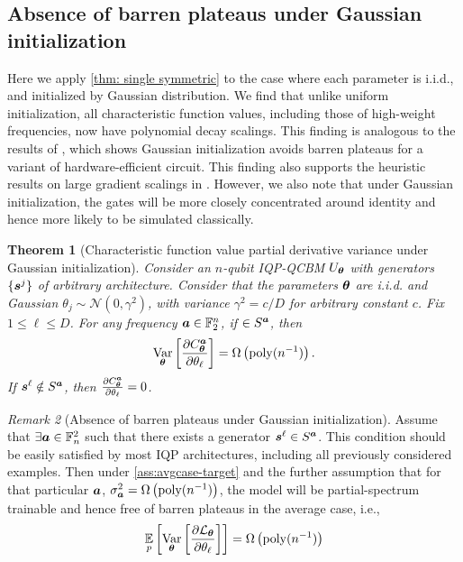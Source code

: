 \documentclass[10pt, twocolumn, a4paper]{article}
\theoremstyle{plain}
\newtheorem{theorem}{Theorem}[section]
\theoremstyle{definition}
\theoremstyle{remark}
\newtheorem{remark}[theorem]{Remark}
\begin{document}
\subsection{Absence of barren plateaus under Gaussian initialization} \label{subsec:gaussian}
Here we apply \cref{thm: single symmetric} to the case where each parameter is i.i.d., and initialized by Gaussian distribution. We find that unlike uniform initialization, all characteristic function values, including those of high-weight frequencies, now have polynomial decay scalings. This finding is analogous to the results of \cite{zhang22}, which shows Gaussian initialization avoids barren plateaus for a variant of hardware-efficient circuit. This finding also supports the heuristic results on large gradient scalings in \cite{recioarmengol25}. However, we also note that under Gaussian initialization, the gates will be more closely concentrated around identity and hence more likely to be simulated classically. 
\begin{theorem}[Characteristic function value partial derivative variance under Gaussian initialization]
\label{thm:poly_lb_gaussian_mmd}
Consider an $n$-qubit IQP-QCBM $U_{\bm{\theta}}$ with generators $\{{\bm{s}^j}\}$ of arbitrary architecture. Consider that the parameters ${\bm{\theta}}$ are i.i.d. and Gaussian $\theta_j \sim\mathcal{N}(0,\gamma^2)$, with variance $\gamma^2 = c/D$ for arbitrary constant $c$. Fix $1\leq \ell \leq D$. For any frequency ${\bm{a}} \in \mathbb{F}_2^n$, if $\in S^{\bm{a}}$, then 
\begin{equation}
\operatorname*{Var}_{{\bm{\theta}}} \left[ \frac{\partial C^{\bm{a}}_{\bm{\theta}}}{\partial \theta_\ell} \right] = \Omega\left(\mathrm{poly}(n^{-1})\right).
\end{equation} 
If ${\bm{s}^\ell} \notin S^{\bm{a}}$, then $\frac{\partial C^{\bm{a}}_{\bm{\theta}}}{\partial \theta_\ell}=0$.
\end{theorem}

\begin{remark}[Absence of barren plateaus under Gaussian initialization]
Assume that $\exists {\bm{a}} \in \mathbb{F}^2_n$ such that there exists a generator ${\bm{s}^\ell} \in S^{\bm{a}}$. This condition should be easily satisfied by most IQP architectures, including all previously considered examples. Then under \cref{ass:avgcase-target} and the further assumption that for that particular ${\bm{a}}$, $\sigma_{\bm{a}}^2 = \Omega\left(\mathrm{poly}(n^{-1})\right)$, the model will be partial-spectrum trainable and hence free of barren plateaus in the average case, i.e., 
\begin{equation*}
\operatorname*{\mathbb{E}}_p\left[\operatorname*{Var}_{{\bm{\theta}}} \left[ \frac{\partial \mathcal{L}_{\bm{\theta}}}{\partial \theta_\ell} \right]\right] = \Omega\left(\mathrm{poly}(n^{-1})\right)
\end{equation*}
\end{remark}
\end{document}
